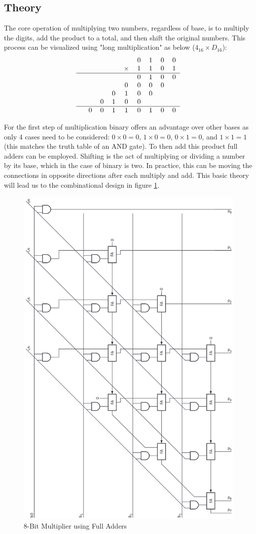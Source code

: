 \documentclass[11pt]{article}
\begin{document}
\subsection{Theory}
The core operation of multiplying two numbers, regardless of base, is to 
multiply the digits, add the product to a total, and then shift the original numbers\cite{dally}.
This process can be visualized using "long multiplication" as below ($4_{16} \times D_{16}$):
\begin{equation}
    \begin{tabular}{c c c c c c c c c }
                &   &   &   &   & 0 & 1 & 0 & 0 \\
                &   &   &   &  $\times$ & 1 & 1 & 0 & 1 \\
                \hline
                &   &   &   &   & 0 & 1 & 0 & 0 \\
                &   &   &   & 0 & 0 & 0 & 0 &   \\
                &   &   & 0 & 1 & 0 & 0 &   &   \\
                &   & 0 & 1 & 0 & 0 &   &   &   \\
                \hline
                & 0 & 0 & 1 & 1 & 0 & 1 & 0 & 0 \\
    \end{tabular} 
\end{equation}

For the first step of multiplication binary offers an advantage over other bases as only 4 cases need to be considered: 
$0 \times 0 = 0$, $1 \times 0 = 0$, $0 \times 1 = 0$, and $1 \times 1 = 1$ (this matches the truth table of an AND gate).
To then add this product full adders can be employed.
Shifting is the act of multiplying or dividing a number by its base, which in the case of binary is two.
In practice, this can be moving the connections in opposite directions after each multiply and add. 
This basic theory will lead us to the combinational design in figure \ref{fig:mult_fa}.

\begin{figure}[H]        
    \centering
    \includegraphics[width=.5\textwidth, origin=c, angle=270]{MultFA.png}
    \caption{8-Bit Multiplier using Full Adders \cite{dally}}
    \label{fig:mult_fa}
\end{figure} 
\end{document}
